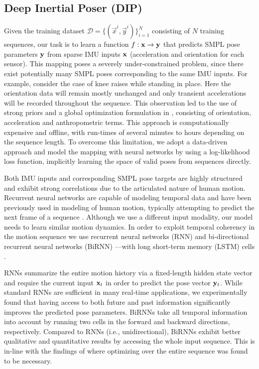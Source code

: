 \documentclass[acmtog]{acmart}
\begin{document}
\subsection{Deep Inertial Poser (DIP)}\label{sec:DIP}%
Given the training dataset $\mathcal{D}=\{(\vec{x}^{i}, \vec{y}^{i})\}_{i=1}^{N}$ consisting of $N$ training sequences, our task is to learn a function $f: \mathbf{x} \rightarrow \mathbf{y}$ that predicts SMPL pose parameters $\mathbf{y}$ from sparse IMU inputs $\mathbf{x}$ (acceleration and orientation for each sensor). This mapping poses a severely under-constrained problem, since there exist potentially many SMPL poses corresponding to the same IMU inputs. For example, consider the case of knee raises while standing in place. Here the orientation data will remain mostly unchanged and only transient accelerations will be recorded throughout the sequence. This observation led to the use of strong priors and a global optimization formulation in \cite{von2017sparse},  consisting of orientation, acceleration and anthropometric terms. This approach is computationally expensive and offline, with run-times of several minutes to hours depending on the sequence length. To overcome this limitation, we adopt a data-driven approach and model the mapping with neural networks by using a log-likelihood loss function, implicitly learning the space of valid poses from sequences directly.

Both IMU inputs and corresponding SMPL pose targets are highly structured and exhibit strong correlations due to the articulated nature of human motion. Recurrent neural networks are capable of modeling temporal data and have been previously used in modeling of human motion, typically attempting to predict the next frame of a sequence \cite{fragkiadaki2015recurrent, martinez2017human, ghosh2017learning}. Although we use a different input modality, our model needs to learn similar motion dynamics. In order to exploit temporal coherency in the motion sequence we use recurrent neural networks (RNN) and bi-directional recurrent neural networks (BiRNN) \cite{schuster1997bidirectional}---with long short-term memory (LSTM) cells \cite{hochreiter1997long}. 

RNNs summarize the entire motion history via a fixed-length hidden state vector and require the current input $\mathbf{x}_t$ in order to predict the pose vector $\mathbf{y}_t$. While standard RNNs are sufficient in many real-time applications, we experimentally found that having access to both future and past information significantly improves the predicted pose parameters. BiRNNs take all temporal information into account by running two cells in the forward and backward directions, respectively. Compared to RNNs (i.e., unidirectional), BiRNNs exhibit better qualitative and quantitative results by accessing the whole input sequence.  This is in-line with the findings of \cite{von2017sparse} where optimizing over the entire sequence was found to be necessary.
\end{document}
